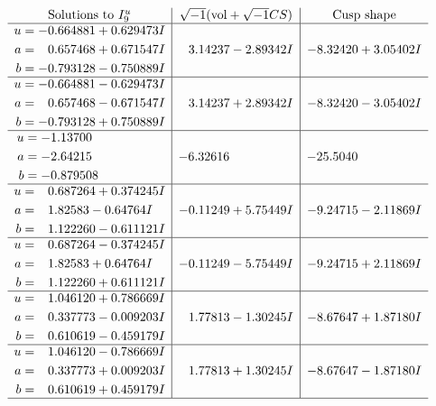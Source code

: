 \documentclass[1p]{elsarticle_modified}
\theoremstyle{definition}
\newcommand{\I}{\sqrt{-1}}
\begin{document}
$$\begin{array}{c|c|c}  
\text{Solutions to }I^u_{9}& \I (\text{vol} + \sqrt{-1}CS) & \text{Cusp shape}\\
 \hline 
\begin{aligned}
u &= -0.664881 + 0.629473 I \\
a &= \phantom{-}0.657468 + 0.671547 I \\
b &= -0.793128 - 0.750889 I\end{aligned}
 & \phantom{-}3.14237 - 2.89342 I & -8.32420 + 3.05402 I \\ \hline\begin{aligned}
u &= -0.664881 - 0.629473 I \\
a &= \phantom{-}0.657468 - 0.671547 I \\
b &= -0.793128 + 0.750889 I\end{aligned}
 & \phantom{-}3.14237 + 2.89342 I & -8.32420 - 3.05402 I \\ \hline\begin{aligned}
u &= -1.13700\phantom{ +0.000000I} \\
a &= -2.64215\phantom{ +0.000000I} \\
b &= -0.879508\phantom{ +0.000000I}\end{aligned}
 & -6.32616\phantom{ +0.000000I} & -25.5040\phantom{ +0.000000I} \\ \hline\begin{aligned}
u &= \phantom{-}0.687264 + 0.374245 I \\
a &= \phantom{-}1.82583 - 0.64764 I \\
b &= \phantom{-}1.122260 - 0.611121 I\end{aligned}
 & -0.11249 + 5.75449 I & -9.24715 - 2.11869 I \\ \hline\begin{aligned}
u &= \phantom{-}0.687264 - 0.374245 I \\
a &= \phantom{-}1.82583 + 0.64764 I \\
b &= \phantom{-}1.122260 + 0.611121 I\end{aligned}
 & -0.11249 - 5.75449 I & -9.24715 + 2.11869 I \\ \hline\begin{aligned}
u &= \phantom{-}1.046120 + 0.786669 I \\
a &= \phantom{-}0.337773 - 0.009203 I \\
b &= \phantom{-}0.610619 - 0.459179 I\end{aligned}
 & \phantom{-}1.77813 - 1.30245 I & -8.67647 + 1.87180 I \\ \hline\begin{aligned}
u &= \phantom{-}1.046120 - 0.786669 I \\
a &= \phantom{-}0.337773 + 0.009203 I \\
b &= \phantom{-}0.610619 + 0.459179 I\end{aligned}
 & \phantom{-}1.77813 + 1.30245 I & -8.67647 - 1.87180 I\\
 \hline 
 \end{array}$$\newpage\newpage\renewcommand{\arraystretch}{1}
\end{document}
